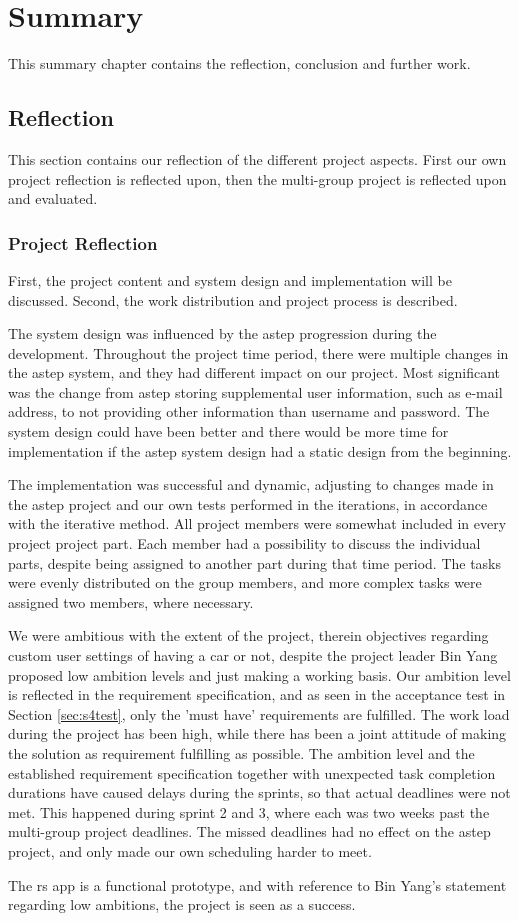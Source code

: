 \chapter{Summary}
This summary chapter contains the reflection, conclusion and further work.

\section{Reflection}
This section contains our reflection of the different project aspects.
First our own project reflection is reflected upon, then the multi-group project is reflected upon and evaluated.

\subsection{Project Reflection}
First, the project content and system design and implementation will be discussed.
Second, the work distribution and project process is described.

The system design was influenced by the \gls{astep} progression during the development.
Throughout the project time period, there were multiple changes in the \gls{astep} system, and they had different impact on our project.
Most significant was the change from \gls{astep} storing supplemental user information, such as e-mail address, to not providing other information than username and password.
The system design could have been better and there would be more time for implementation if the \gls{astep} system design had a static design from the beginning.

The implementation was successful and dynamic, adjusting to changes made in the \gls{astep} project and our own tests performed in the iterations, in accordance with the iterative method.
All project members were somewhat included in every project project part.
Each member had a possibility to discuss the individual parts, despite being assigned to another part during that time period.
The tasks were evenly distributed on the group members, and more complex tasks were assigned two members, where necessary.

We were ambitious with the extent of the project, therein objectives regarding custom user settings of having a car or not, despite the project leader Bin Yang proposed low ambition levels and just making a working basis.
Our ambition level is reflected in the requirement specification, and as seen in the acceptance test in Section \ref{sec:s4test}, only the 'must have' requirements are fulfilled.
The work load during the project has been high, while there has been a joint attitude of making the solution as requirement fulfilling as possible.
The ambition level and the established requirement specification together with unexpected task completion durations have caused delays during the sprints, so that actual deadlines were not met.
This happened during sprint 2 and 3, where each was two weeks past the multi-group project deadlines.
The missed deadlines had no effect on the \gls{astep} project, and only made our own scheduling harder to meet.


The \gls{rs} app is a functional prototype, and with reference to Bin Yang's statement regarding low ambitions, the project is seen as a success.


